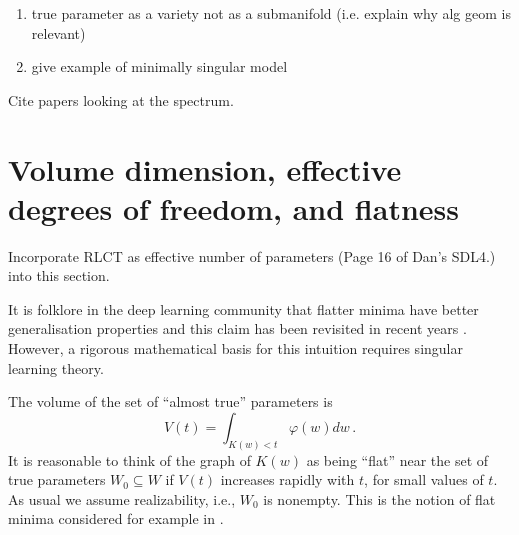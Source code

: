 \documentclass{article} %
\begin{document}
\begin{enumerate}
    \item true parameter as a variety not as a submanifold (i.e. explain why alg geom is relevant)
    \item give example of minimally singular model
\end{enumerate}

Cite papers looking at the spectrum.





\section{Volume dimension, effective degrees of freedom, and flatness}
\label{section:no_flat_minima}

Incorporate RLCT as effective number of parameters (Page 16 of Dan's SDL4.) into this section.


It is folklore in the deep learning community that flatter minima have better generalisation properties \citep{hinton1993keeping, hochreiter1997flat} and this claim has been revisited in recent years \citep{chaudhari2019entropy, smith2017bayesian, jastrzkebski2017three, Zhang:2018MolPh.116.3214Z}. However, a rigorous mathematical basis for this intuition requires singular learning theory.

The volume of the set of ``almost true'' parameters is
\[
V(t) = \int_{K(w) < t} \varphi(w) dw\,.
\]
It is reasonable to think of the graph of $K(w)$ as being ``flat'' near the set of true parameters $W_0 \subseteq W$ if $V(t)$ increases rapidly with $t$, for small values of $t$. As usual we assume realizability, i.e., $W_0$ is nonempty. This is the notion of flat minima considered for example in \citep{hochreiter1997flat}.
\end{document}
